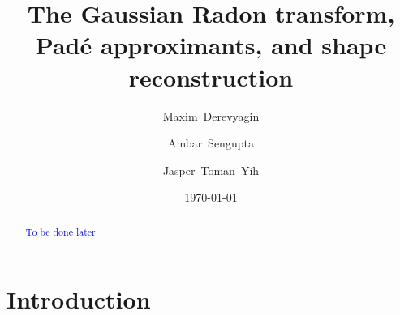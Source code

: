 \documentclass{amsart}
\theoremstyle{remark}
\numberwithin{equation}{section}
\newcommand{\tc}{\textcolor{blue}}
\begin{document}
\title{The Gaussian Radon transform, Pad\'e approximants, and shape reconstruction}


\date{\today}

\author[M.~Derevyagin]{Maxim~Derevyagin}
\address{
MD,
Department of Mathematics\\
University of Connecticut\\
341 Mansfield Road, U-1009\\
Storrs, CT 06269–1009, USA}

\author[A.~Sengupta]{Ambar~Sengupta}
\address{
AS,
Department of Mathematics\\
University of Connecticut\\
341 Mansfield Road, U–1009\\
Storrs, CT 0626–91009, USA}

\author[J.~Toman–Yih]{Jasper~Toman–Yih}
\address{
JT,
Department of Mathematics\\
University of Connecticut\\
341 Mansfield Road, U–1009\\
Storrs, CT 06269–1009, USA}


\begin{abstract}
\tc{To be done later}
\end{abstract}

\maketitle

\section{Introduction}
\end{document}
